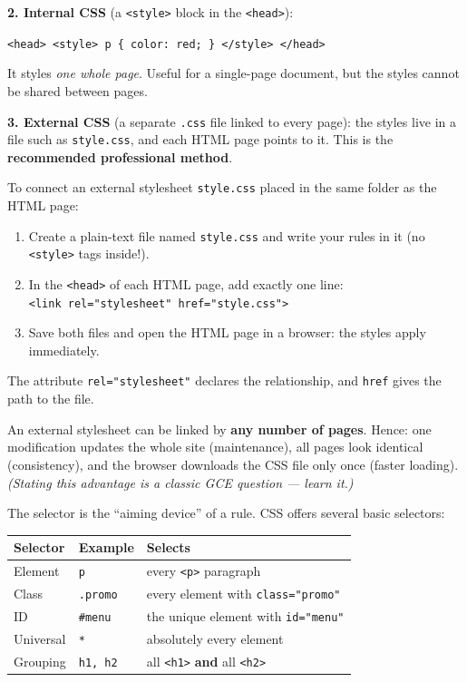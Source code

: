 \documentclass[11pt]{article}
\newcounter{popsec}
\newcounter{popsub}
\newcommand{\courssub}[1]{%
  \stepcounter{popsub}%
  \par\vspace{9pt}\noindent{\popxbold\fontsize{11.5}{13}\selectfont\color{popink}{\color{poporange}\thepopsec.\thepopsub}\hspace{6pt}#1}\par\nopagebreak\vspace{4pt}
}
\begin{document}
\textbf{2. Internal CSS} (a \texttt{<style>} block in the \texttt{<head>}):
\begin{center}
\texttt{<head> <style> p \{ color: red; \} </style> </head>}
\end{center}
It styles \emph{one whole page}. Useful for a single-page document, but the styles cannot be shared between pages.

\textbf{3. External CSS} (a separate \texttt{.css} file linked to every page): the styles live in a file such as \texttt{style.css}, and each HTML page points to it. This is the \textbf{recommended professional method}.

\begin{methode}
To connect an external stylesheet \texttt{style.css} placed in the same folder as the HTML page:
\begin{enumerate}
\item Create a plain-text file named \texttt{style.css} and write your rules in it (no \texttt{<style>} tags inside!).
\item In the \texttt{<head>} of each HTML page, add exactly one line:\\
\texttt{<link rel="stylesheet" href="style.css">}
\item Save both files and open the HTML page in a browser: the styles apply immediately.
\end{enumerate}
The attribute \texttt{rel="stylesheet"} declares the relationship, and \texttt{href} gives the path to the file.
\end{methode}

\begin{propriete}
An external stylesheet can be linked by \textbf{any number of pages}. Hence: one modification updates the whole site (maintenance), all pages look identical (consistency), and the browser downloads the CSS file only once (faster loading). \emph{(Stating this advantage is a classic GCE question --- learn it.)}
\end{propriete}

\courssub{Basic Selectors}

The selector is the ``aiming device'' of a rule. CSS offers several basic selectors:

\begin{center}
\begin{tabularx}{\linewidth}{|l|l|X|}
\hline
\rowcolor{popblueL} \textbf{Selector} & \textbf{Example} & \textbf{Selects} \\
\hline
Element & \texttt{p} & every \texttt{<p>} paragraph \\
\hline
Class & \texttt{.promo} & every element with \texttt{class="promo"} \\
\hline
ID & \texttt{\#menu} & the unique element with \texttt{id="menu"} \\
\hline
Universal & \texttt{*} & absolutely every element \\
\hline
Grouping & \texttt{h1, h2} & all \texttt{<h1>} \textbf{and} all \texttt{<h2>} \\
\hline
\end{tabularx}
\end{center}
\end{document}
